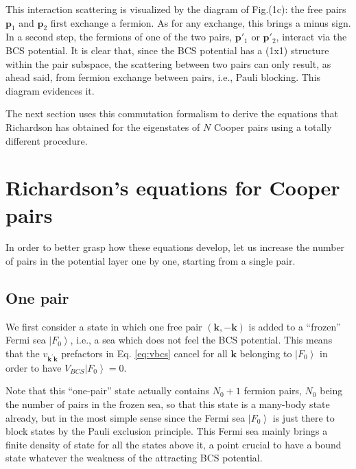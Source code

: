 \documentclass[aps,prb,superscriptaddress,showpacs,reprint,lengthcheck]{revtex4-1}
\begin{document}
This interaction scattering is visualized by the diagram of Fig.(1c): the free pairs $\mathbf{p}_1$ and $\mathbf{p}_2$ first
exchange a fermion. As for any exchange, this brings a minus sign. In a
second step, the fermions of one of the two pairs, $\mathbf{p}' _1$ or ${\mathbf{p}}' _2$,  interact via the BCS
potential. It is clear that, since the BCS potential has a (1x1)
structure within the pair subspace, the scattering between two pairs can only result, as ahead said, from
fermion exchange between pairs, i.e., Pauli blocking. This diagram evidences it.

The next section uses this commutation formalism to derive the equations that Richardson has obtained for the eigenstates of $N$ Cooper pairs using a totally different procedure.

\section{Richardson's equations for Cooper pairs\label{sec:rich}}

In order to better grasp how these equations develop, let us increase the number of pairs in the potential layer one by one, starting from a single pair.

\subsection{One pair}

We first consider a state in which one free pair $(\mathbf{k} ,-\mathbf{k} )$ is added to a
``frozen'' Fermi sea $\left|F_0\right> $, i.e., a sea which does not feel the BCS potential.
This means that the $v_{\mathbf{k} ^{\prime}\mathbf{k} }$ prefactors in Eq.%
\eqref{eq:vbcs} cancel for all $\mathbf{k} $ belonging to $\left|F_0\right> $ in order to have $V_{BCS} \left|F_0\right>=0$.

 Note that this ``one-pair'' state actually contains $N_0+1$ fermion pairs, 
$N_0$ being the number of pairs in the frozen sea, so that this state is a many-body state already, but in the most simple sense since the Fermi sea $%
\left|F_0\right> $ is just there to block states by the Pauli exclusion
principle. This Fermi sea mainly brings a finite density of state for all the
states above it, a point crucial to have a bound state whatever the weakness of the attracting BCS potential.
\end{document}
